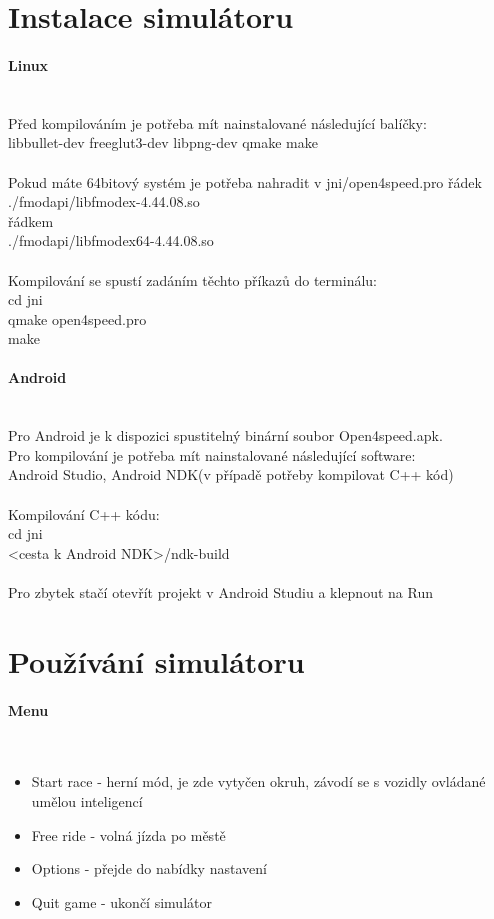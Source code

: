 \documentclass[11pt,twoside,a4paper]{book}
\begin{document}
\section{Instalace simulátoru}

\paragraph{Linux}\ \ \\
Před kompilováním je potřeba mít nainstalované následující balíčky:\ \ \\
libbullet-dev freeglut3-dev libpng-dev qmake make\ \ \\
\ \ \\
Pokud máte 64bitový systém je potřeba nahradit v jni/open4speed.pro řádek\ \ \\
./fmodapi/libfmodex-4.44.08.so\ \ \\
řádkem\ \ \\
./fmodapi/libfmodex64-4.44.08.so\ \ \\
\ \ \\
Kompilování se spustí zadáním těchto příkazů do terminálu:\ \ \\
cd jni\ \ \\
qmake open4speed.pro\ \ \\
make

\paragraph{Android}\ \ \\
Pro Android je k dispozici spustitelný binární soubor Open4speed.apk.\ \ \\
Pro kompilování je potřeba mít nainstalované následující software:\ \ \\
Android Studio, Android NDK(v případě potřeby kompilovat C++ kód)\ \ \\
\ \ \\
Kompilování C++ kódu:\ \ \\
cd jni\ \ \\
<cesta k Android NDK>/ndk-build\ \ \\
\ \ \\
Pro zbytek stačí otevřít projekt v Android Studiu a klepnout na Run

\section{Používání simulátoru}
\paragraph{Menu}\ \ \\
\begin{itemize}
\item Start race - herní mód, je zde vytyčen okruh, závodí se s vozidly ovládané umělou inteligencí
\item Free ride - volná jízda po městě
\item Options - přejde do nabídky nastavení
\item Quit game - ukončí simulátor
\end{itemize}
\end{document}
